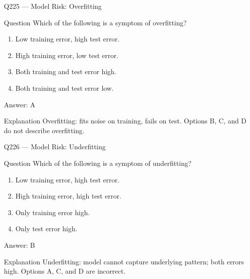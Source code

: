 \documentclass[aspectratio=169,8pt]{beamer}
\begin{document}
																																\begin{frame}{Q225 --- Model Risk: Overfitting}
																																	\begin{block}{Question}
																																		Which of the following is a symptom of overfitting?
																																		\begin{enumerate}
																																			\item Low training error, high test error.
																																			\item High training error, low test error.
																																			\item Both training and test error high.
																																			\item Both training and test error low.
																																		\end{enumerate}  \end{block}
																																		\begin{exampleblock}{Answer: A}\end{exampleblock}
																																		\begin{block}{Explanation}
																																			Overfitting: fits noise on training, fails on test. Options B, C, and D do not describe overfitting.
																																		\end{block}
																																	\end{frame}
																																	
																																	\begin{frame}{Q226 --- Model Risk: Underfitting}
																																		\begin{block}{Question}
																																			Which of the following is a symptom of underfitting?
																																			\begin{enumerate}
																																				\item Low training error, high test error.
																																				\item High training error, high test error.
																																				\item Only training error high.
																																				\item Only test error high.
																																			\end{enumerate}  \end{block}
																																			\begin{exampleblock}{Answer: B}\end{exampleblock}
																																			\begin{block}{Explanation}
																																				Underfitting: model cannot capture underlying pattern; both errors high. Options A, C, and D are incorrect.
																																			\end{block}
																																		\end{frame}
																																		
\end{document}
